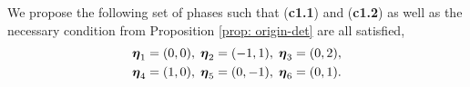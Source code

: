 \begin{comment}
{\it Remark.} In Lemma \ref{lem: phase-ineq}, $\Msub[:,1]$ and $\Msub[:,6]$ being independent only guarantees $\det(\Msub[\widehat{k_{\V{\omega}}},:])\neq 0$. However, \eqref{eq: m0-cramer} implies that $|m_0(\V{\omega})|\propto \det(\Msub[\widehat{k_{\V{\omega}}},:])$ hence it is preferred to maximize the determinant. Since
\begin{align*}
\det(\Msub[\widehat{k_{\V{\omega}}}, :]) = \det\big(\big[\, \Msub[\widehat{k_{\V{\omega}}},-6], \;\Msub[\widehat{k_{\V{\omega}}},6] + c \cdot\Msub[\widehat{k_{\V{\omega}}},1]  \,\big]\big),\quad 
\end{align*}
$\forall c\in \mathbb{C}$, the angle between $\Msub[:,1]$ and $\Msub[:,6]$ should be maximized.
Therefore, a stronger condition than ({\bf c1.1}) is to require $\Msub[:,1]$ and $\Msub[:,6]$ be orthogonal, which is equivalent to 
\begin{align*}
(\V{\eta}_1-\V{\eta}_6)^\top(\pi/2, \pi/2) = \pi \,(\text{mod}\, 2\pi).\tag{\bf c2.1}
\end{align*}
The stronger condition corresponding to ({\bf c1.2}) is 
\begin{align*}
(\V{\eta}_3-\V{\eta}_4)^\top(-\pi/2,\pi/2)=\pi(\text{mod},\,2\pi).\tag{\bf c2.2}
\end{align*} %


Unfortunately, Proposition \ref{prop: origin-det} prevents ({\bf c2.1}) and ({\bf c2.2}) from holding simultaneously.
\end{comment}
We propose the following set of phases such that ({\bf c1.1}) and ({\bf c1.2}) as well as the necessary condition from Proposition \ref{prop: origin-det} are all satisfied,
\begin{align}\label{eq: phase-sol}
\boldsymbol{\eta}_1 = (0,0),\; \boldsymbol{\eta}_2 = (-1,1),\; \boldsymbol{\eta}_3 = (0,2),\notag\\
\boldsymbol{\eta}_4 = (1,0),\; \boldsymbol{\eta}_5 = (0,-1),\; \boldsymbol{\eta}_6 = (0,1).
\end{align}

